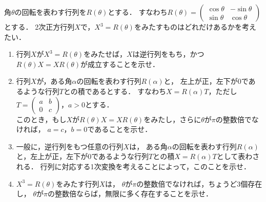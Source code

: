 \documentclass[../../main.tex]{subfiles}
\begin{document}
角$\theta$の回転を表わす行列を$R(\theta)$とする．
すなわち$R(\theta)=
\begin{pmatrix} \cos\theta & -\sin\theta \\ \sin\theta & \cos\theta
\end{pmatrix}$とする．
2次正方行列$X$で，$X^3=R(\theta)$をみたすものはどれだけあるかを考えたい．
\begin{enumerate}
  \item 行列$X$が$X^3=R(\theta)$をみたせば，$X$は逆行列をもち，かつ$R(\theta)X=XR(\theta)$が成立することを示せ．
  \item 行列$X$が，ある角$\alpha$の回転を表わす行列$R(\alpha)$と，
    左上が正，左下が0であるような行列$T$との積であるとする．
    すなわち$X=R(\alpha)T$，ただし$T=
    \begin{pmatrix} a & b \\ 0 & c
    \end{pmatrix}$，$a>0$とする．\\
    このとき，もし$X$が$R(\theta)X=XR(\theta)$をみたし，さらに$\theta$が$\pi$の整数倍でなければ，
    $a=c$，$b=0$であることを示せ．
  \item 一般に，逆行列をもつ任意の行列$X$は，
    ある角$\alpha$の回転を表わす行列$R(\alpha)$と，左上が正，左下が0であるような行列$T$との積$X=R(\alpha)T$として表わされる．
    行列に対応する1次変換を考えることによって，このことを示せ．
  \item $X^3=R(\theta)$をみたす行列$X$は，
    $\theta$が$\pi$の整数倍でなければ，ちょうど3個存在し，
    $\theta$が$\pi$の整数倍ならば，無限に多く存在することを示せ．
\end{enumerate}
\end{document}
